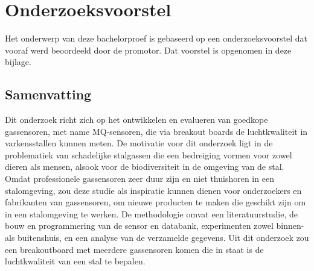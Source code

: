 \documentclass[dutch,dit,thesis,export]{hogentreport}
\begin{document}













\appendix

\chapter{Onderzoeksvoorstel}

Het onderwerp van deze bachelorproef is gebaseerd op een onderzoeksvoorstel dat vooraf werd beoordeeld door de promotor. Dat voorstel is opgenomen in deze bijlage.


\section*{Samenvatting}

    Dit onderzoek richt zich op het ontwikkelen en evalueren van goedkope gassensoren, met name MQ-sensoren, die via breakout boards de luchtkwaliteit in varkensstallen kunnen meten. De motivatie voor dit onderzoek ligt in de problematiek van schadelijke stalgassen die een bedreiging vormen voor zowel dieren als mensen, alsook voor de biodiversiteit in de omgeving van de stal. Omdat professionele gassensoren zeer duur zijn en niet thuishoren in een stalomgeving, zou deze studie als inspiratie kunnen dienen voor onderzoekers en fabrikanten van gassensoren, om nieuwe producten te maken die geschikt zijn om in een stalomgeving te werken. De methodologie omvat een literatuurstudie, de bouw en programmering van de sensor en databank, experimenten zowel binnen- als buitenshuis, en een analyse van de verzamelde gegevens. Uit dit onderzoek zou een breakoutboard met meerdere gassensoren komen die in staat is de luchtkwaliteit van een stal te bepalen.
    
    



\end{document}
